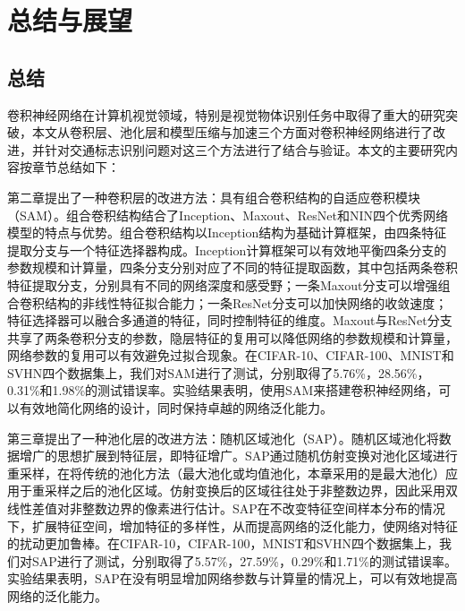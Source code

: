 \chapter{总结与展望}
\label{cha:conclusion}

\section{总结}

卷积神经网络在计算机视觉领域，特别是视觉物体识别任务中取得了重大的研究突破，本文从卷积层、池化层和模型压缩与加速三个方面对卷积神经网络进行了改进，并针对交通标志识别问题对这三个方法进行了结合与验证。本文的主要研究内容按章节总结如下：

第二章提出了一种卷积层的改进方法：具有组合卷积结构的自适应卷积模块（SAM）。组合卷积结构结合了Inception、Maxout、ResNet和NIN四个优秀网络模型的特点与优势。组合卷积结构以Inception结构为基础计算框架，由四条特征提取分支与一个特征选择器构成。Inception计算框架可以有效地平衡四条分支的参数规模和计算量，四条分支分别对应了不同的特征提取函数，其中包括两条卷积特征提取分支，分别具有不同的网络深度和感受野；一条Maxout分支可以增强组合卷积结构的非线性特征拟合能力；一条ResNet分支可以加快网络的收敛速度；特征选择器可以融合多通道的特征，同时控制特征的维度。Maxout与ResNet分支共享了两条卷积分支的参数，隐层特征的复用可以降低网络的参数规模和计算量，网络参数的复用可以有效避免过拟合现象。在CIFAR-10、CIFAR-100、MNIST和SVHN四个数据集上，我们对SAM进行了测试，分别取得了5.76\%，28.56\%，0.31\%和1.98\%的测试错误率。实验结果表明，使用SAM来搭建卷积神经网络，可以有效地简化网络的设计，同时保持卓越的网络泛化能力。

第三章提出了一种池化层的改进方法：随机区域池化（SAP）。随机区域池化将数据增广的思想扩展到特征层，即特征增广。SAP通过随机仿射变换对池化区域进行重采样，在将传统的池化方法（最大池化或均值池化，本章采用的是最大池化）应用于重采样之后的池化区域。仿射变换后的区域往往处于非整数边界，因此采用双线性差值对非整数边界的像素进行估计。SAP在不改变特征空间样本分布的情况下，扩展特征空间，增加特征的多样性，从而提高网络的泛化能力，使网络对特征的扰动更加鲁棒。在CIFAR-10，CIFAR-100，MNIST和SVHN四个数据集上，我们对SAP进行了测试，分别取得了5.57\%，27.59\%，0.29\%和1.71\%的测试错误率。实验结果表明，SAP在没有明显增加网络参数与计算量的情况上，可以有效地提高网络的泛化能力。

